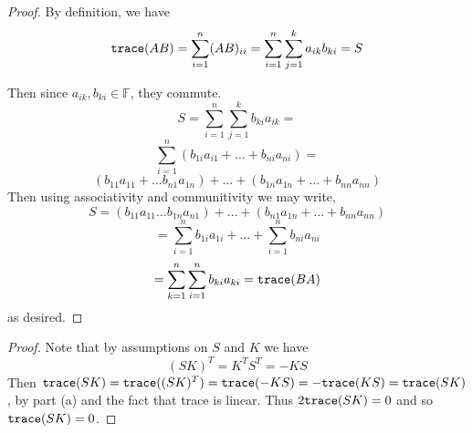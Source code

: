 \newpage
    \question 
\begin{alphaparts}
    \questionpart 
    \begin{proof}
        By definition, we have 
        \begin{equation}
            {\tt trace}(AB) = \sum_{i = 1}^n(AB)_{ii} = \sum_{i = 1}^n \sum_{j = 1}^k a_{ik}b_{ki} = S
        \end{equation}
    
        Then since $a_{ik}, b_{ki} \in \mathbb{F}$, they commute. 
        \[S = \sum_{i = 1}^n \sum_{j = 1}^k b_{ki}a_{ik} = \]
        \[\sum_{i = 1}^n(b_{1i}a_{i1} + \dots + b_{ni}a_{ni}) = \]
        \[(b_{11}a_{11} + \dots b_{n1}a_{1n}) + \dots + (b_{1n}a_{1n} +  \dots + b_{nn}a_{nn})\]
        Then using associativity and communitivity we may write, 
        \[S = (b_{11}a_{11} \dots b_{1n}a_{n1}) + \dots + (b_{n1} a_{1n} + \dots + b_{nn}a_{nn})\]
        \[= \sum_{i = 1}^n b_{1i}a_{1i} + \dots + \sum_{i = 1}^n b_{ni}a_{ni}\]
        \[= \sum_{k = 1}^n \sum_{i= 1}^n b_{ki}a_{ki} = {\tt trace}(BA)\]
        as desired. 
        \end{proof}
    

    \questionpart 
    \begin{proof}
        Note that by assumptions on $S$ and $K$ we have 
        \[(SK)^T = K^TS^T = - KS \]
        Then ${\tt trace}(SK) = {\tt trace}((SK)^T) = {\tt trace}(-KS) = - {\tt trace}(KS) = {\tt trace}(SK)$, by part (a) and the fact that trace is linear. 
        Thus $2{\tt trace}(SK) = 0$ and so ${\tt trace}(SK) = 0$. 
    \end{proof}
\end{alphaparts}

